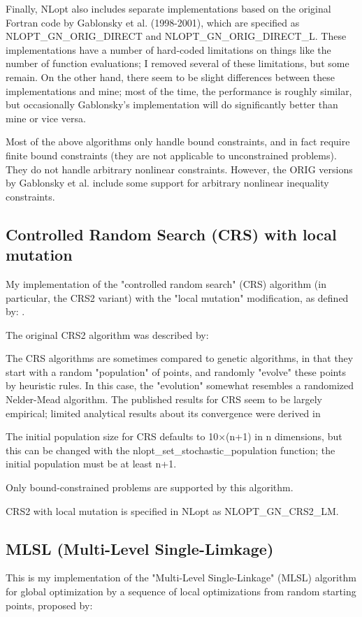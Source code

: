 Finally, NLopt also includes separate implementations based on the original Fortran code by Gablonsky et al. (1998-2001), which are specified as NLOPT\_GN\_ORIG\_DIRECT and NLOPT\_GN\_ORIG\_DIRECT\_L. These implementations have a number of hard-coded limitations on things like the number of function evaluations; I removed several of these limitations, but some remain. On the other hand, there seem to be slight differences between these implementations and mine; most of the time, the performance is roughly similar, but occasionally Gablonsky's implementation will do significantly better than mine or vice versa. 

Most of the above algorithms only handle bound constraints, and in fact require finite bound constraints (they are not applicable to unconstrained problems). They do not handle arbitrary nonlinear constraints. However, the ORIG versions by Gablonsky et al. include some support for arbitrary nonlinear inequality constraints. 



\subsection{Controlled Random Search (CRS) with local mutation}
My implementation of the "controlled random search" (CRS) algorithm (in particular, the CRS2 variant) with the "local mutation" modification, as defined by: 
\cite{Kaelo_2006}. 

The original CRS2 algorithm was described by: \cite{Price_1978, Price_1983} 


The CRS algorithms are sometimes compared to genetic algorithms, in that they start with a random "population" of points, and randomly "evolve" these points by heuristic rules. In this case, the "evolution" somewhat resembles a randomized Nelder-Mead algorithm. The published results for CRS seem to be largely empirical; limited analytical results about its convergence were derived in \cite{Hendrix_2001}


The initial population size for CRS defaults to 10×(n+1) in n dimensions, but this can be changed with the nlopt\_set\_stochastic\_population function; the initial population must be at least n+1. 

Only bound-constrained problems are supported by this algorithm. 

CRS2 with local mutation is specified in NLopt as NLOPT\_GN\_CRS2\_LM. 




\subsection{MLSL (Multi-Level Single-Limkage)}
This is my implementation of the "Multi-Level Single-Linkage" (MLSL) algorithm for global optimization by a sequence of local optimizations from random starting points, proposed by: \cite{RinnooyKan_1987a, RinnooyKan_1987b}


